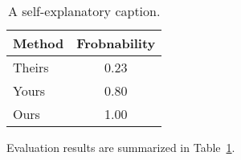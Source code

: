 \begin{table}
  \centering
  \caption{A self-explanatory caption.}
  \label{tab:example1}
  \begin{tabular}{l|c}
    \hline
    \textbf{Method} & \textbf{Frobnability}\\\hline
    Theirs & 0.23 \\
    Yours  & 0.80 \\
    Ours   & 1.00 \\\hline
  \end{tabular}
\end{table}

Evaluation results are summarized in Table~\ref{tab:example1}.
